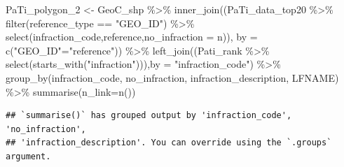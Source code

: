 \documentclass[
]{article}
\newenvironment{Shaded}{\begin{snugshade}}{\end{snugshade}}
\newcommand{\AttributeTok}[1]{\textcolor[rgb]{0.77,0.63,0.00}{#1}}
\newcommand{\FunctionTok}[1]{\textcolor[rgb]{0.00,0.00,0.00}{#1}}
\newcommand{\NormalTok}[1]{#1}
\newcommand{\OtherTok}[1]{\textcolor[rgb]{0.56,0.35,0.01}{#1}}
\newcommand{\SpecialCharTok}[1]{\textcolor[rgb]{0.00,0.00,0.00}{#1}}
\newcommand{\StringTok}[1]{\textcolor[rgb]{0.31,0.60,0.02}{#1}}
\begin{document}
\begin{Shaded}
\begin{Highlighting}[]
\NormalTok{PaTi\_polygon\_2 }\OtherTok{\textless{}{-}}\NormalTok{ GeoC\_shp }\SpecialCharTok{\%\textgreater{}\%} 
  \FunctionTok{inner\_join}\NormalTok{((PaTi\_data\_top20 }\SpecialCharTok{\%\textgreater{}\%}
               \FunctionTok{filter}\NormalTok{(reference\_type }\SpecialCharTok{==} \StringTok{"GEO\_ID"}\NormalTok{) }\SpecialCharTok{\%\textgreater{}\%}
               \FunctionTok{select}\NormalTok{(infraction\_code,reference,}\AttributeTok{no\_infraction =}\NormalTok{ n)),}
             \AttributeTok{by =} \FunctionTok{c}\NormalTok{(}\StringTok{"GEO\_ID"}\OtherTok{=}\StringTok{"reference"}\NormalTok{)) }\SpecialCharTok{\%\textgreater{}\%} 
  \FunctionTok{left\_join}\NormalTok{((Pati\_rank }\SpecialCharTok{\%\textgreater{}\%} \FunctionTok{select}\NormalTok{(}\FunctionTok{starts\_with}\NormalTok{(}\StringTok{"infraction"}\NormalTok{))),}\AttributeTok{by =} \StringTok{"infraction\_code"}\NormalTok{) }\SpecialCharTok{\%\textgreater{}\%} 
  \FunctionTok{group\_by}\NormalTok{(infraction\_code, no\_infraction, infraction\_description, LFNAME) }\SpecialCharTok{\%\textgreater{}\%} 
  \FunctionTok{summarise}\NormalTok{(}\AttributeTok{n\_link=}\FunctionTok{n}\NormalTok{())}
\end{Highlighting}
\end{Shaded}

\begin{verbatim}
## `summarise()` has grouped output by 'infraction_code', 'no_infraction',
## 'infraction_description'. You can override using the `.groups` argument.
\end{verbatim}
\end{document}
